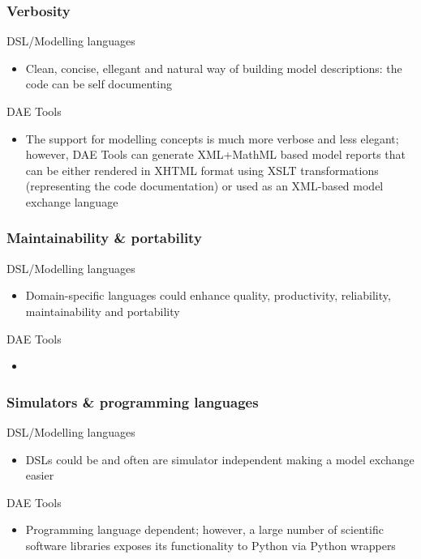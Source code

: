 \documentclass[compress,newPxFont,sthlmFooter]{beamer}
\begin{document}
\begin{frame}
\frametitle{Verbosity}
\begin{block}{\textcolor{light_green}{DSL/Modelling languages}}
\begin{itemize}
  \item Clean, concise, ellegant and natural way of building model descriptions: the code can be self documenting
\end{itemize}
\end{block}

\begin{block}{\textcolor{light_red}{DAE Tools}}
\begin{itemize}
  \item The support for modelling concepts is much more verbose and less elegant; however, DAE Tools can generate XML+MathML
	based model reports that can be either rendered in XHTML format using XSLT transformations (representing the code documentation)
	or used as an XML-based model exchange language
\end{itemize}
\end{block}
\end{frame}

\begin{frame}
\frametitle{Maintainability \& portability}
\begin{block}{\textcolor{light_green}{DSL/Modelling languages}}
\begin{itemize}
  \item Domain-specific languages could enhance quality, productivity, reliability, maintainability and portability
\end{itemize}
\end{block}

\begin{block}{\textcolor{light_red}{DAE Tools}}
\begin{itemize}
  \item 
\end{itemize}
\end{block}
\end{frame}

\begin{frame}
\frametitle{Simulators \& programming languages}
\begin{block}{\textcolor{light_green}{DSL/Modelling languages}}
\begin{itemize}
  \item DSLs could be and often are simulator independent making a model exchange easier
\end{itemize}
\end{block}

\begin{block}{\textcolor{light_red}{DAE Tools}}
\begin{itemize}
  \item Programming language dependent; however, a large number of scientific software libraries exposes its functionality
        to Python via Python wrappers
\end{itemize}
\end{block}
\end{frame}
\end{document}
